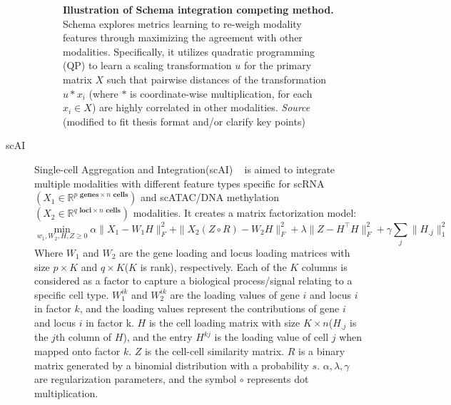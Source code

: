 \begin{description}
\begin{figure}[!ht]
    	\vspace{0.1cm}
    	\caption[Illustration of Schema integration competing method.]{\textbf{Illustration of Schema integration competing method.} Schema explores metrics learning to re-weigh modality features through maximizing the agreement with other modalities. Specifically, it utilizes quadratic programming (QP) to learn a scaling transformation $u$ for the primary matrix $X$ such that pairwise distances of the transformation $u * x_i$ (where $*$ is coordinate-wise multiplication, for each $x_i\in X$) are highly correlated in other modalities. \emph{Source ~\cite{singh2021schema}} (modified to fit thesis format and/or clarify key points)
    }
    	\label{fig:Alg_Schema}
    \end{figure}    
    \item[scAI]
    Single-cell Aggregation and Integration(scAI) ~\citep{jin2020scai} is aimed to integrate multiple modalities with different feature types specific for scRNA $(X_1\in \mathbb{R}^{p \textbf{ genes} \times n \textbf{ cells}})$ and scATAC/DNA methylation$(X_2\in \mathbb{R}^{q \textbf{ loci}\times n \textbf{ cells}})$ modalities. It creates a matrix factorization model:
    \begin{equation}
    \min_{w_1,W_2,H,Z\geq 0} \alpha \|X_1-W_1H\|_F^2 + \|X_2(Z \circ R)-W_2H\|_F^2 + \lambda \|Z-H^\top H\|_F^2 + \gamma\sum_j \|H_{.j}\|_1^2
    \end{equation}
    Where $W_1$ and $W_2$ are the gene loading and locus loading matrices with size $p\times K$ and $q\times K$($K$ is rank), respectively. Each of the $K$ columns is considered as a factor to capture a biological process/signal relating to a specific cell type. $W_1^{ik}$ and $W_2^{ik}$ are the loading values of gene $i$ and locus $i$ in factor $k$, and the loading values represent the contributions of gene $i$ and locus $i$ in factor k. $H$ is the cell loading matrix with size $K\times n$($H_{.j}$ is the $j$th column of $H$), and the entry $H^{kj}$ is the loading value of cell $j$ when mapped onto factor $k$. $Z$ is the cell-cell similarity matrix. $R$ is a binary matrix generated by a binomial distribution with a probability $s$. $\alpha, \lambda, \gamma$ are regularization parameters, and the symbol $\circ$ represents dot multiplication.
    

\end{description}
